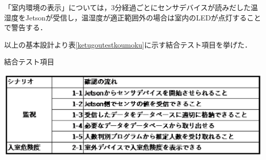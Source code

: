 「室内環境の表示」については，3分経過ごとにセンサデバイスが読みだした温湿度をJetsonが受信し，温湿度が適正範囲外の場合は室内のLEDが点灯することで警告する．

以上の基本設計より表\ref{ketugoutestkoumoku}に示す結合テスト項目を挙げた．

\begin{table}
	\centering
	\caption{結合テスト項目}
	\label{ketugoutestkoumoku}
	\includegraphics[width=0.9\linewidth]{test/ketugoutest_koumoku}
\end{table}
